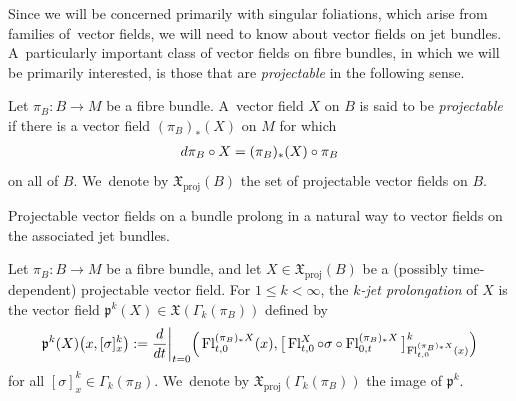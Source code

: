 \documentclass[11pt]{article}
\numberwithin{equation}{section}
\numberwithin{equation}{section}
\def\proj{\operatorname{proj}}
\def\Fl{\operatorname{Fl}}
\def\XF{{\mathfrak{X}}}
\def\pf{{\mathfrak{p}}}
\begin{document}
Since we will be concerned primarily with singular foliations, which arise from families of~vec\-tor fields, we will need to know about vector fields on jet bundles. A~particularly important class of vector fields on fibre bundles, in which we will be primarily interested, is those that are \textit{projectable} in the following sense.

\begin{Definition}%
Let $\pi_{B}\colon B\rightarrow M$ be a fibre bundle. A~vector field $X$ on $B$ is said to be \textit{pro\-jec\-table} if there is a vector field $(\pi_{B})_{*}(X)$ on $M$ for which
\begin{gather}\label{projectableeqn}
{\rm d}\pi_{B}\circ X = (\pi_{B})_{*}(X)\circ \pi_{B}
\end{gather}
on all of $B$. We~denote by $\XF_{\proj}(B)$ the set of projectable vector fields on $B$.
\end{Definition}

Projectable vector fields on a bundle prolong in a natural way to vector fields on the associated jet bundles.

\begin{Definition}
Let $\pi_{B}\colon B\rightarrow M$ be a fibre bundle, and let $X\in\XF_{\proj}(B)$ be a (possibly time-dependent) projectable vector field. For $1\leq k<\infty$, the \textit{$k$-jet prolongation} of $X$ is the vector field $\pf^{k}(X)\in\XF(\Gamma_{k}(\pi_{B}))$ defined by
\begin{gather*}
\pf^{k}(X)\big(x,[\sigma]^{k}_{x}\big):=\frac{\rm d}{{\rm d}t}\bigg|_{t=0}\Big(\Fl^{(\pi_{B})_{*}X}_{t,0}(x),\big[\Fl^{X}_{t,0}\circ \sigma\circ\Fl^{(\pi_{B})_{*}X}_{0,t}\big]^{k}_{\Fl^{(\pi_{B})_{*}X}_{t,0}(x)}\Big)
\end{gather*}
for all $[\sigma]^{k}_{x}\in \Gamma_{k}(\pi_{B})$. We~denote by $\XF_{\proj}(\Gamma_{k}(\pi_{B}))$ the image of $\pf^{k}$.
\end{Definition}
\end{document}
